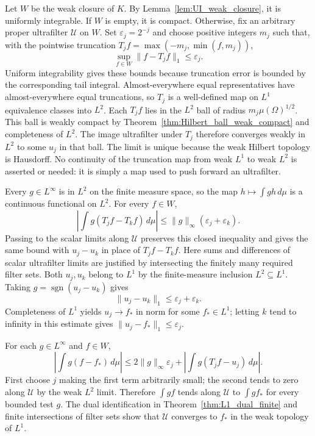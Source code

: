 Let $W$ be the weak closure of $K$. By Lemma~\ref{lem:UI_weak_closure},
it is uniformly integrable. If $W$ is empty, it is compact. Otherwise,
fix an arbitrary proper ultrafilter $\mathcal U$ on $W$.
Set $\varepsilon_j=2^{-j}$ and choose positive integers $m_j$ such that,
with the pointwise truncation $T_j f=\max(-m_j,\min(f,m_j))$,
\[
\sup_{f\in W}\|f-T_jf\|_1\leq\varepsilon_j.
\]
Uniform integrability gives these bounds because truncation error is
bounded by the corresponding tail integral. Almost-everywhere equal
representatives have almost-everywhere equal truncations, so $T_j$
is a well-defined map on $L^1$ equivalence classes into $L^2$. Each
$T_jf$ lies in the
$L^2$ ball of radius $m_j\mu(\Omega)^{1/2}$. This ball is weakly
compact by Theorem~\ref{thm:Hilbert_ball_weak_compact} and completeness
of $L^2$. The image ultrafilter under $T_j$ therefore converges weakly
in $L^2$ to some $u_j$ in that ball. The limit is unique because the
weak Hilbert topology is Hausdorff. No continuity of the truncation
map from weak $L^1$ to weak $L^2$ is asserted or needed: it is simply
a map used to push forward an ultrafilter.

Every $g\in L^\infty$ is in $L^2$ on the finite measure space, so the
map $h\mapsto\int gh\,d\mu$ is a continuous functional on $L^2$.
For every $f\in W$,
\[
\left|\int g(T_jf-T_kf)\,d\mu\right|
 \leq\|g\|_\infty(\varepsilon_j+\varepsilon_k).
\]
Passing to the scalar limits along $\mathcal U$ preserves this closed
inequality and gives the same bound with $u_j-u_k$ in place of
$T_jf-T_kf$. Here sums and differences of scalar ultrafilter limits
are justified by intersecting the finitely many required filter sets.
Both $u_j,u_k$ belong to $L^1$ by the finite-measure inclusion
$L^2\subseteq L^1$. Taking $g=\operatorname{sgn}(u_j-u_k)$ gives
\[
\|u_j-u_k\|_1\leq\varepsilon_j+\varepsilon_k.
\]
Completeness of $L^1$ yields $u_j\to f_*$ in norm for some $f_*\in L^1$;
letting $k$ tend to infinity in this estimate gives
$\|u_j-f_*\|_1\leq\varepsilon_j$.

For each $g\in L^\infty$ and $f\in W$,
\[
\left|\int g(f-f_*)\,d\mu\right|
\leq 2\|g\|_\infty\varepsilon_j
   +\left|\int g(T_jf-u_j)\,d\mu\right|.
\]
First choose $j$ making the first term arbitrarily small; the second
tends to zero along $\mathcal U$ by the weak $L^2$ limit. Therefore
$\int gf$ tends along $\mathcal U$ to $\int gf_*$ for every bounded
test $g$. The dual identification in Theorem~\ref{thm:L1_dual_finite}
and finite intersections of filter sets show that $\mathcal U$
converges to $f_*$ in the weak topology of $L^1$.

